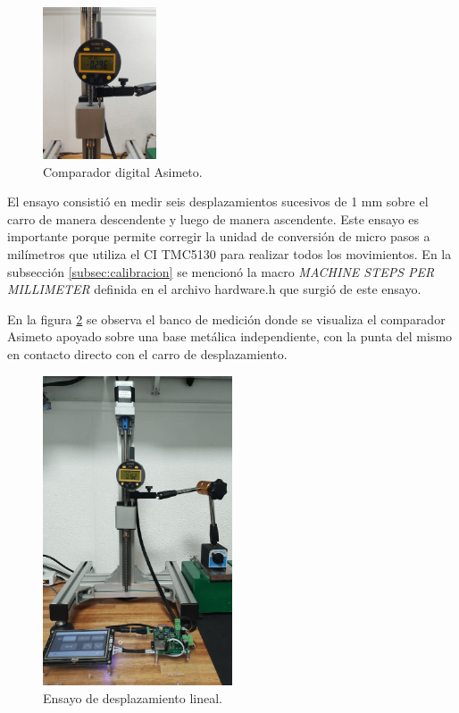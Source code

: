 \begin{figure}[h]
\centering 
\includegraphics[width=0.3\textwidth]{./Figures/micrometro.png}
\caption{Comparador digital Asimeto.}
\label{fig:micrometro}
\end{figure}

El ensayo consistió en medir seis desplazamientos sucesivos de 1 mm sobre el carro de manera descendente y luego de manera ascendente. Este ensayo es importante porque permite corregir la unidad de conversión de micro pasos a milímetros que utiliza el CI TMC5130 para realizar todos los movimientos. 
En la subsección \ref{subsec:calibracion} se mencionó la macro \textit{MACHINE STEPS PER MILLIMETER} definida en el archivo hardware.h que surgió de este ensayo. 

En la figura \ref{fig:desplazamiento_lineal} se observa el banco de medición donde se visualiza el comparador Asimeto apoyado sobre una base metálica independiente, con la punta del mismo en contacto directo con el carro de desplazamiento.

\begin{figure}[h]
\centering 
\includegraphics[width=0.5\textwidth]{./Figures/desplazamiento_lineal.png}
\caption{Ensayo de desplazamiento lineal.}
\label{fig:desplazamiento_lineal}
\end{figure}


